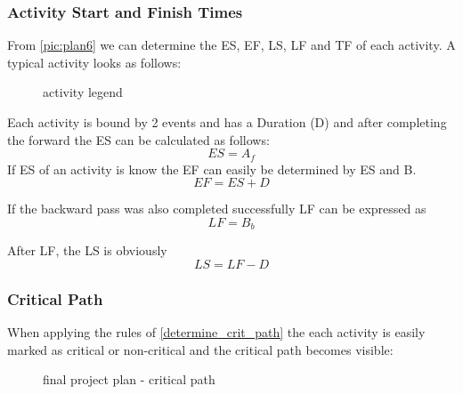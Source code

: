 \subsubsection{Activity Start and Finish Times}
From \autoref{pic:plan6} we can determine the ES, EF, LS, LF and TF of each activity. A typical activity looks as follows:
\begin{figure}[h] 
\centerline{}
\caption{activity legend}
\label{pic:activity_plan}
\end{figure}
Each activity is bound by 2 events and has a Duration (D) and after completing the forward the ES can be calculated as follows:
\begin{equation}
ES = A_{f}
\end{equation}
If ES of an activity is know the EF can easily be determined by ES and B.
\begin{equation}
EF = ES + D
\end{equation}

If the backward pass was also completed successfully LF can be expressed as
\begin{equation}
LF = B_{b}
\end{equation}

After LF, the LS is obviously
\begin{equation}
LS = LF - D
\end{equation}

\subsubsection{Critical Path}

When applying the rules of \ref{determine_crit_path} the each activity is easily marked as critical or non-critical and the critical path becomes visible:
\begin{figure}[h] 
\centerline{}
\caption{final project plan - critical path}
\label{pic:plan7}
\end{figure}







